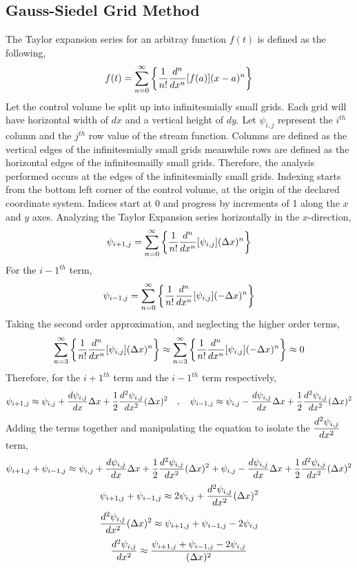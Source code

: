 \documentclass[class=report, 12pt, crop=false]{standalone}
\begin{document}
\begin{center}
\subsection{Gauss-Siedel Grid Method}
\begin{comment}
\end{comment}
The Taylor expansion series for an arbitray function $f(t)$ is defined as the following,
$$f(t) = \sum^{\infty}_{n = 0}\left\{\frac{1}{n!}\frac{d^n}{dx^n}[f(a)](x - a)^n\right\}$$
Let the control volume be split up into infinitesmially small grids. Each grid will have horizontal width of $dx$ and a vertical height of $dy$. Let $\psi_{i,j}$ represent the $i^{th}$ column and the $j^{th}$ row value of the stream function. Columns are defined as the vertical edges of the infinitesmially small grids meanwhile rows are defined as the horizontal edges of the infinitesmailly small grids. Therefore, the analysis performed occurs at the edges of the infinitesmially small grids. Indexing starts from the bottom left corner of the control volume, at the origin of the declared coordinate system. Indices start at 0 and progress by increments of 1 along the $x$ and $y$ axes. Analyzing the Taylor Expansion series horizontally in the $x$-direction,
$$\psi_{i + 1,j} = \sum^{\infty}_{n = 0}\left\{\frac{1}{n!}\frac{d^n}{dx^n}[\psi_{i,j}](\Delta x)^n\right\}$$
For the ${i - 1}^{th}$ term,
$$\psi_{i - 1,j} = \sum^{\infty}_{n = 0}\left\{\frac{1}{n!}\frac{d^n}{dx^n}[\psi_{i,j}](-\Delta x)^n\right\}$$
Taking the second order approximation, and neglecting the higher order terms,
$$\sum^{\infty}_{n = 3}\left\{\frac{1}{n!}\frac{d^n}{dx^n}[\psi_{i,j}](\Delta x)^n\right\}\approx \sum^{\infty}_{n = 3}\left\{\frac{1}{n!}\frac{d^n}{dx^n}[\psi_{i,j}](-\Delta x)^n\right\}\approx 0$$
Therefore, for the ${i + 1}^{th}$ term and the ${i - 1}^{th}$ term respectively,
$$\psi_{i + 1,j} \approx \psi_{i,j} + \frac{d\psi_{i,j}}{dx}\Delta x + \frac{1}{2}\frac{d^2\psi_{i,j}}{dx^2}(\Delta x)^2 \quad,\quad \psi_{i - 1,j} \approx \psi_{i,j} - \frac{d\psi_{i,j}}{dx}\Delta x + \frac{1}{2}\frac{d^2\psi_{i,j}}{dx^2}(\Delta x)^2$$
Adding the terms together and manipulating the equation to isolate the $\displaystyle{\frac{d^2\psi_{i,j}}{dx^2}}$ term,
$$\psi_{i + 1,j} + \psi_{i - 1,j} \approx \psi_{i,j} + \frac{d\psi_{i,j}}{dx}\Delta x + \frac{1}{2}\frac{d^2\psi_{i,j}}{dx^2}(\Delta x)^2 + \psi_{i,j} - \frac{d\psi_{i,j}}{dx}\Delta x + \frac{1}{2}\frac{d^2\psi_{i,j}}{dx^2}(\Delta x)^2$$
$$\psi_{i + 1,j} + \psi_{i - 1,j} \approx 2\psi_{i,j} + \frac{d^2\psi_{i,j}}{dx^2}(\Delta x)^2$$
$$\frac{d^2\psi_{i,j}}{dx^2}(\Delta x)^2\approx \psi_{i + 1,j} + \psi_{i - 1,j} - 2\psi_{i,j}$$
$$\frac{d^2\psi_{i,j}}{dx^2} \approx \frac{\psi_{i + 1,j} + \psi_{i - 1,j} - 2\psi_{i,j}}{(\Delta x)^2}$$

\end{center}
\end{document}
